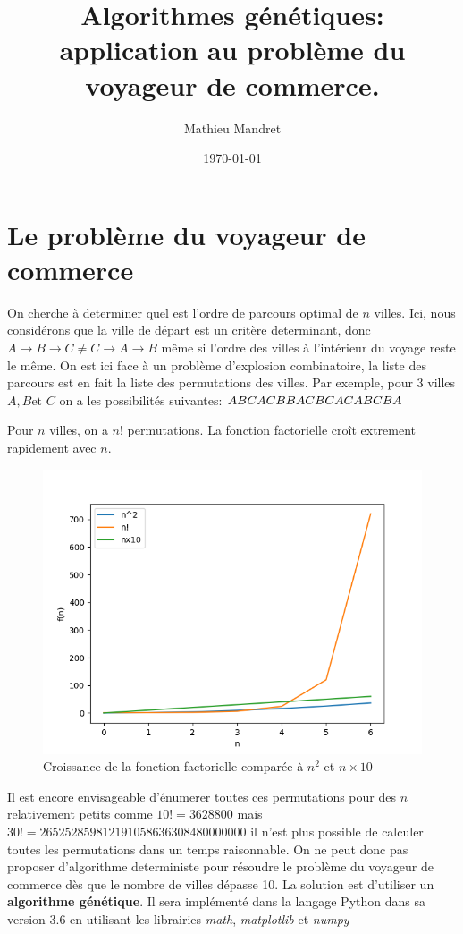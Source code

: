 \documentclass[11pt]{article}
\author{Mathieu Mandret}
\date{\today}
\title{Algorithmes génétiques: application au problème du voyageur de commerce.}
\begin{document}
\maketitle
\tableofcontents


\section{Le problème du voyageur de commerce}
\label{sec-1}
On cherche à determiner quel est l'ordre de parcours optimal de $n$ villes. Ici, nous considérons que la ville de départ est un critère determinant,
donc $A \rightarrow B \rightarrow C  \neq   C \rightarrow A \rightarrow B$ même si l'ordre des villes à l'intérieur du 
voyage reste le même. On est ici face à un problème d'explosion combinatoire, la liste des parcours est en fait la liste des permutations des villes.
Par exemple, pour 3 villes $A, B \text{et } C$ on a les possibilités suivantes:
$A B C \\ A C B \\ B A C \\ B C A \\ C A B \\ C B A$

Pour $n$ villes, on a $n!$ permutations. La fonction factorielle croît extrement rapidement avec $n$.
\begin{figure}[htb]
\centering
\includegraphics[width=.9\linewidth]{./complexite.png}
\caption{Croissance de la fonction factorielle comparée à $n^2$ et $n\times10$}
\end{figure}

Il est encore envisageable d'énumerer toutes ces permutations pour des $n$ relativement petits comme $10! = 3628800$ mais $30! = 265252859812191058636308480000000$ il n'est plus possible
de calculer toutes les permutations dans un temps raisonnable. On ne peut donc pas proposer d'algorithme deterministe pour résoudre le problème du voyageur de commerce dès que le nombre de villes
dépasse 10. La solution est d'utiliser un \textbf{algorithme génétique}. Il sera implémenté dans la langage
Python dans sa version 3.6 en utilisant les librairies \emph{math}, \emph{matplotlib} et \emph{numpy}
\end{document}
